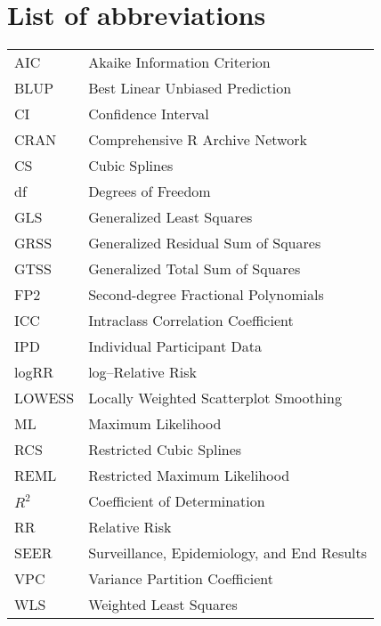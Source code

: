 %

\chapter*{List of abbreviations}
\begin{tabular}{ll}

AIC & Akaike Information Criterion \\
BLUP & Best Linear Unbiased Prediction \\
CI & Confidence Interval \\
CRAN & Comprehensive R Archive Network \\
CS & Cubic Splines \\
df & Degrees of Freedom \\
GLS & Generalized Least Squares \\
GRSS & Generalized Residual Sum of Squares \\
GTSS & Generalized Total Sum of Squares \\
FP2 & Second-degree Fractional Polynomials \\
ICC & Intraclass Correlation Coefficient \\
IPD & Individual Participant Data \\
logRR & log--Relative Risk \\
LOWESS & Locally Weighted Scatterplot Smoothing \\
ML & Maximum Likelihood \\
RCS & Restricted Cubic Splines \\
REML & Restricted Maximum Likelihood \\
$R^2$ & Coefficient of Determination \\
RR & Relative Risk \\
SEER & Surveillance, Epidemiology, and End Results \\
VPC & Variance Partition Coefficient \\
WLS & Weighted Least Squares


\end{tabular}